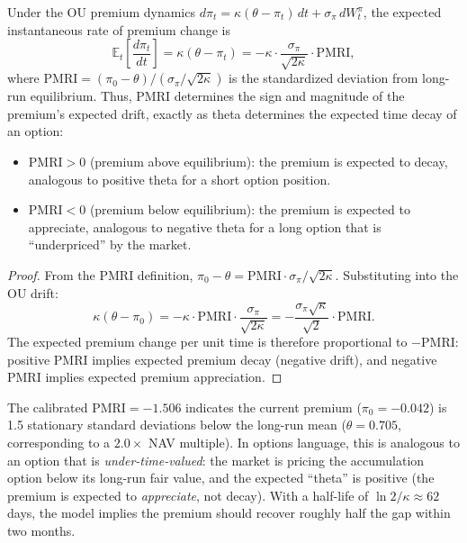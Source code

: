 \begin{proposition}
\label{prop:pmri_theta}
Under the OU premium dynamics $d\pi_t = \kappa(\theta - \pi_t)\,dt + \sigma_\pi\, dW_t^\pi$, the expected instantaneous rate of premium change is
\begin{equation}
\label{eq:premium_drift}
  \mathbb{E}_t\!\left[\frac{d\pi_t}{dt}\right] = \kappa(\theta - \pi_t) = -\kappa \cdot \frac{\sigma_\pi}{\sqrt{2\kappa}} \cdot \mathrm{PMRI},
\end{equation}
where $\mathrm{PMRI} = (\pi_0 - \theta) / (\sigma_\pi / \sqrt{2\kappa})$ is the standardized deviation from long-run equilibrium. Thus, $\mathrm{PMRI}$ determines the sign and magnitude of the premium's expected drift, exactly as theta determines the expected time decay of an option:
\begin{itemize}
  \item $\mathrm{PMRI} > 0$ (premium above equilibrium): the premium is expected to decay, analogous to positive theta for a short option position.
  \item $\mathrm{PMRI} < 0$ (premium below equilibrium): the premium is expected to appreciate, analogous to negative theta for a long option that is ``underpriced'' by the market.
\end{itemize}
\end{proposition}

\begin{proof}
From the PMRI definition, $\pi_0 - \theta = \mathrm{PMRI} \cdot \sigma_\pi / \sqrt{2\kappa}$. Substituting into the OU drift:
\[
  \kappa(\theta - \pi_0) = -\kappa \cdot \mathrm{PMRI} \cdot \frac{\sigma_\pi}{\sqrt{2\kappa}} = -\frac{\sigma_\pi \sqrt{\kappa}}{\sqrt{2}} \cdot \mathrm{PMRI}.
\]
The expected premium change per unit time is therefore proportional to $-\mathrm{PMRI}$: positive PMRI implies expected premium decay (negative drift), and negative PMRI implies expected premium appreciation.
\end{proof}

\begin{remark}
\label{rem:pmri_calibrated}
The calibrated $\mathrm{PMRI} = -1.506$ indicates the current premium ($\pi_0 = -0.042$) is 1.5 stationary standard deviations below the long-run mean ($\theta = 0.705$, corresponding to a $2.0\times$ NAV multiple). In options language, this is analogous to an option that is \emph{under-time-valued}: the market is pricing the accumulation option below its long-run fair value, and the expected ``theta'' is positive (the premium is expected to \emph{appreciate}, not decay). With a half-life of $\ln 2 / \kappa \approx 62$ days, the model implies the premium should recover roughly half the gap within two months.
\end{remark}

